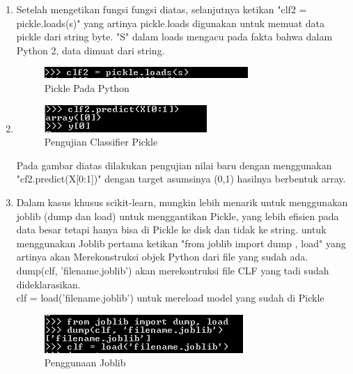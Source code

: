\begin{enumerate}
\item
Setelah mengetikan fungsi fungsi diatas, selanjutnya ketikan "clf2 = pickle.loads(s)" yang artinya pickle.loads digunakan untuk memuat data pickle dari string byte. "S" dalam loads mengacu pada fakta bahwa dalam Python 2, data dimuat dari string.
\begin{figure}
	\begin{center}
   	 \includegraphics[scale=1]{figures/tasya9.png}
   	 \caption{Pickle Pada Python}	
	\end{center}
\end{figure}
\item
\begin{figure}
	\begin{center}
   	 \includegraphics[scale=1]{figures/tasya10.png}
   	 \caption{Pengujian Classifier Pickle}	
	\end{center}
\end{figure}
Pada gambar diatas dilakukan pengujian nilai baru dengan menggunakan "cf2.predict(X[0:1])" dengan target asumsinya (0,1) hasilnya berbentuk array.
\item
Dalam kasus khusus scikit-learn, mungkin lebih menarik untuk menggunakan joblib (dump dan load) untuk menggantikan Pickle, yang lebih efisien pada data besar tetapi hanya bisa di Pickle ke disk dan tidak ke string. untuk menggunakan Joblib pertama ketikan "from joblib import dump , load" yang artinya akan Merekonstruksi objek Python dari file yang sudah ada.\\

dump(clf, 'filename.joblib') akan merekontruksi file CLF yang tadi sudah dideklarasikan.\\
clf = load('filename.joblib') untuk mereload model yang sudah di Pickle\\
\begin{figure}
	\begin{center}
   	 \includegraphics[scale=1]{figures/tasya11.png}
   	 \caption{Penggunaan Joblib}	
	\end{center}
\end{figure}
\end{enumerate}

